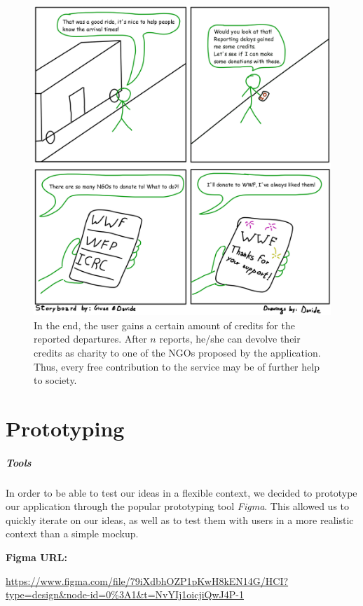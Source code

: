 \documentclass[a4paper, 11pt]{report}
\newenvironment{inlinebox}[1][]{%
  \titlebox%
  {\upshape\bfseries #1}%
}{%
  \endbasecolorbox%
}
\begin{document}
\vspace{2cm}
\begin{figure}[H]
	\centering
	\includegraphics[width=.9\textwidth]{img/storyboards/storyboard_donations.png}
	\caption{In the end, the user gains a certain amount of credits for the reported departures.
		After $n$ reports, he/she can devolve their credits as charity to one of the NGOs proposed by the application.
		Thus, every free contribution to the service may be of further help to society.}\label{fig:d}
\end{figure}

\chapter{Prototyping}\label{chap:prototyping}

\paragraph{Tools}
In order to be able to test our ideas in a flexible context, we decided to prototype our application
through the popular prototyping tool \emph{Figma}. This allowed us to quickly iterate on our ideas,
as well as to test them with users in a more realistic context than a simple mockup.

\begin{center}
	\begin{inlinebox}[Figma URL:]
		\centering
		\url{https://www.figma.com/file/79iXdbhOZP1pKwH8kEN14G/HCI?type=design&node-id=0%3A1&t=NvYIj1oicjiQwJ4P-1}
	\end{inlinebox}
\end{center}
\end{document}
